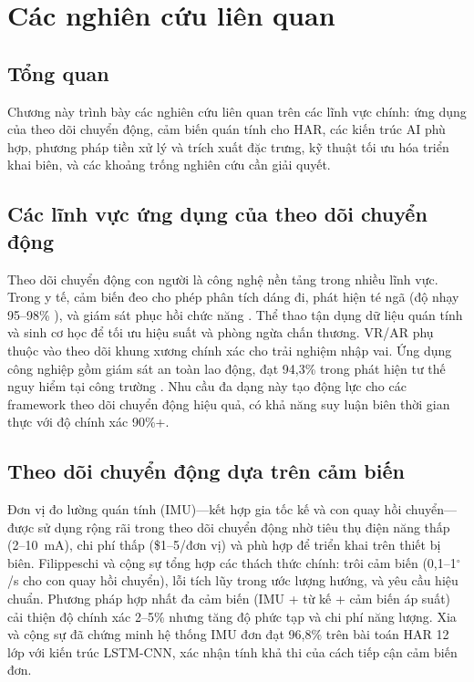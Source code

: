 \chapter{Các nghiên cứu liên quan}
\label{chap:relatedwork}

\section{Tổng quan}
Chương này trình bày các nghiên cứu liên quan trên các lĩnh vực chính: ứng dụng của theo dõi chuyển động, cảm biến quán tính cho HAR, các kiến trúc AI phù hợp, phương pháp tiền xử lý và trích xuất đặc trưng, kỹ thuật tối ưu hóa triển khai biên, và các khoảng trống nghiên cứu cần giải quyết.

\section{Các lĩnh vực ứng dụng của theo dõi chuyển động}
Theo dõi chuyển động con người là công nghệ nền tảng trong nhiều lĩnh vực. Trong y tế, cảm biến đeo cho phép phân tích dáng đi, phát hiện té ngã (độ nhạy 95--98\% \cite{wan2021deep_har_review}), và giám sát phục hồi chức năng \cite{article:human_motion_tracking_survey}. Thể thao tận dụng dữ liệu quán tính và sinh cơ học để tối ưu hiệu suất và phòng ngừa chấn thương. VR/AR phụ thuộc vào theo dõi khung xương chính xác cho trải nghiệm nhập vai. Ứng dụng công nghiệp gồm giám sát an toàn lao động, đạt 94,3\% trong phát hiện tư thế nguy hiểm tại công trường \cite{wang2023har_industrial}. Nhu cầu đa dạng này tạo động lực cho các framework theo dõi chuyển động hiệu quả, có khả năng suy luận biên thời gian thực với độ chính xác 90\%+.

\section{Theo dõi chuyển động dựa trên cảm biến}
Đơn vị đo lường quán tính (IMU)---kết hợp gia tốc kế và con quay hồi chuyển---được sử dụng rộng rãi trong theo dõi chuyển động nhờ tiêu thụ điện năng thấp (2--10~mA), chi phí thấp (\$1--5/đơn vị) và phù hợp để triển khai trên thiết bị biên. Filippeschi và cộng sự \cite{filippeschi2017survey_imu} tổng hợp các thách thức chính: trôi cảm biến (0,1--1$^\circ$/s cho con quay hồi chuyển), lỗi tích lũy trong ước lượng hướng, và yêu cầu hiệu chuẩn. Phương pháp hợp nhất đa cảm biến (IMU + từ kế + cảm biến áp suất) cải thiện độ chính xác 2--5\% nhưng tăng độ phức tạp và chi phí năng lượng. Xia và cộng sự \cite{xia2020lstm_har} đã chứng minh hệ thống IMU đơn đạt 96,8\% trên bài toán HAR 12 lớp với kiến trúc LSTM-CNN, xác nhận tính khả thi của cách tiếp cận cảm biến đơn.


